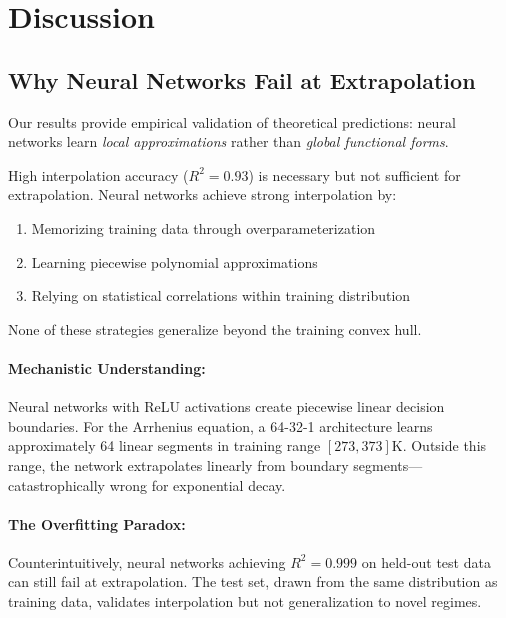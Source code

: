 \documentclass[twoside,11pt]{article}
\begin{document}
\section{Discussion}
\label{sec:discussion}

\subsection{Why Neural Networks Fail at Extrapolation}\citep{liu2020understanding}\citep{zhou2020universality}

Our results provide empirical validation of theoretical predictions: neural networks learn \emph{local approximations} rather than \emph{global functional forms}\citep{liu2020understanding}\citep{zhou2020universality}.

\begin{remark}
High interpolation accuracy ($R^2 = 0.93$) is necessary but not sufficient for extrapolation\citep{liu2020understanding}\citep{zhou2020universality}. Neural networks achieve strong interpolation by:
\begin{enumerate}
\item Memorizing training data through overparameterization
\item Learning piecewise polynomial approximations
\item Relying on statistical correlations within training distribution
\end{enumerate}
None of these strategies generalize beyond the training convex hull.
\end{remark}

\paragraph{Mechanistic Understanding:} Neural networks with ReLU activations create piecewise linear decision boundaries. For the Arrhenius equation, a 64-32-1 architecture learns approximately 64 linear segments in training range $[273, 373]$K. Outside this range, the network extrapolates linearly from boundary segments---catastrophically wrong for exponential decay\citep{liu2020understanding}\citep{zhou2020universality}.

\paragraph{The Overfitting Paradox:} Counterintuitively, neural networks achieving $R^2 = 0.999$ on held-out test data can still fail at extrapolation. The test set, drawn from the same distribution as training data, validates interpolation but not generalization to novel regimes\citep{liu2020understanding}\citep{liu2020understanding}\citep{neyshabur2017exploring}\citep{zhang2021understanding}\citep{zhou2020universality}.
\end{document}
